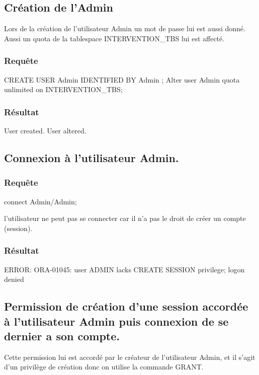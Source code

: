 \documentclass[•]{article}
\begin{document}
\def\reportnumber{2}
\def\reporttitle{Gestion des droits}


\subsection{Création de l'Admin}
\textrm{Lors de la création de l'utilisateur Admin un mot de passe lui est aussi donné.}
\textrm{Aussi un quota de la tablespace INTERVENTION\_TBS lui est affecté. }

\subsubsection{Requête}
\begin{sql}
CREATE USER Admin IDENTIFIED BY Admin ;
Alter user Admin quota unlimited on INTERVENTION_TBS;
\end{sql}
\subsubsection{Résultat}
\begin{sql}
User created.
User altered.
\end{sql}


\subsection{Connexion à l'utilisateur Admin.}
\subsubsection{Requête}
\begin{sql}
connect Admin/Admin;
\end{sql}
\textrm{l'utilisateur ne peut pas se connecter car il n'a pas le droit de créer un compte (session).}
\subsubsection{Résultat}
\begin{sql}
ERROR:
ORA-01045: user ADMIN lacks CREATE SESSION privilege; logon denied
\end{sql}
\subsection{Permission de création d’une session accordée à l'utilisateur Admin puis connexion de se dernier a son compte.}

\textrm{Cette permission lui est accordé par le créateur de l'utilisateur Admin, et il s'agit d'un privilège de création donc on utilise la commande GRANT. }
\end{document}
